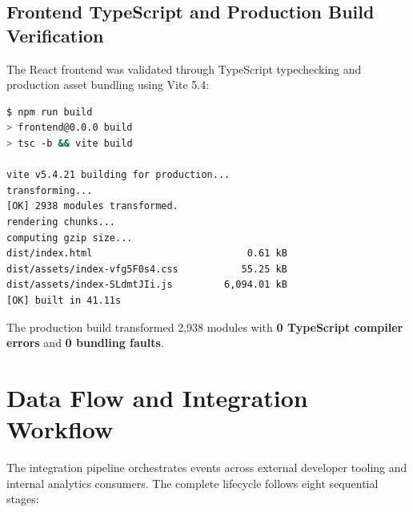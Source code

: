\documentclass[11pt,a4paper]{article}
\begin{document}
\subsection{Frontend TypeScript and Production Build Verification}
The React frontend was validated through TypeScript typechecking and production asset bundling using Vite 5.4:
\begin{lstlisting}[language=bash]
$ npm run build
> frontend@0.0.0 build
> tsc -b && vite build

vite v5.4.21 building for production...
transforming...
[OK] 2938 modules transformed.
rendering chunks...
computing gzip size...
dist/index.html                           0.61 kB
dist/assets/index-vfg5F0s4.css           55.25 kB
dist/assets/index-SLdmtJIi.js         6,094.01 kB
[OK] built in 41.11s
\end{lstlisting}
The production build transformed 2,938 modules with \textbf{0 TypeScript compiler errors} and \textbf{0 bundling faults}.

\section{Data Flow and Integration Workflow}
The integration pipeline orchestrates events across external developer tooling and internal analytics consumers. The complete lifecycle follows eight sequential stages:
\end{document}
